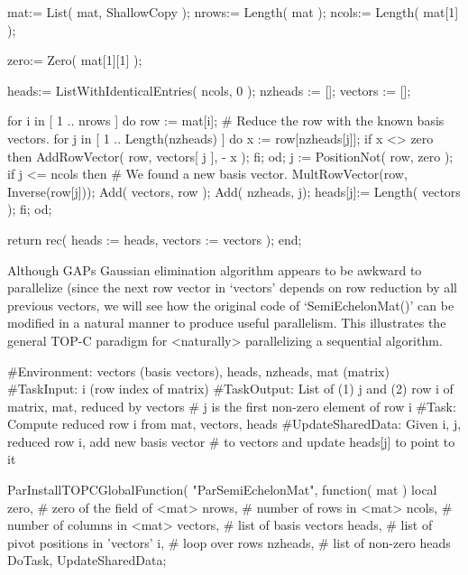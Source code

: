    mat:= List( mat, ShallowCopy );
    nrows:= Length( mat );
    ncols:= Length( mat[1] );

    zero:= Zero( mat[1][1] );

    heads:= ListWithIdenticalEntries( ncols, 0 );
    nzheads := [];
    vectors := [];

    for i in [ 1 .. nrows ] do
        row := mat[i];
        # Reduce the row with the known basis vectors.
        for j in [ 1 .. Length(nzheads) ] do
            x := row[nzheads[j]];
            if x <> zero then
                AddRowVector( row, vectors[ j ], - x );
            fi;
        od;
        j := PositionNot( row, zero );
        if j <= ncols then
            # We found a new basis vector.
            MultRowVector(row, Inverse(row[j]));
            Add( vectors, row );
            Add( nzheads, j);
            heads[j]:= Length( vectors );
        fi;
    od;

    return rec( heads   := heads,
                vectors := vectors );
    end;
\endexample


Although GAP{\pif}s Gaussian elimination algorithm appears to be
awkward to parallelize (since the next row vector in `vectors' depends
on row reduction by all previous vectors, we will see how the original
code of `SemiEchelonMat()' can be modified in a natural manner to
produce useful parallelism.  This illustrates the general TOP-C
paradigm for <naturally> parallelizing a sequential algorithm.

\beginexample
#Environment: vectors (basis vectors), heads, nzheads, mat (matrix)
#TaskInput:   i (row index of matrix)
#TaskOutput:  List of (1) j and (2) row i of matrix, mat, reduced by vectors
#               j is the first non-zero element of row i
#Task:        Compute reduced row i from mat, vectors, heads
#UpdateSharedData:  Given i, j, reduced row i, add new basis vector
#               to vectors and update heads[j] to point to it

ParInstallTOPCGlobalFunction( "ParSemiEchelonMat", function( mat )
    local zero,      # zero of the field of <mat>
          nrows,     # number of rows in <mat>
          ncols,     # number of columns in <mat>
          vectors,   # list of basis vectors
          heads,     # list of pivot positions in 'vectors'
          i,         # loop over rows
          nzheads,   # list of non-zero heads
          DoTask, UpdateSharedData;

